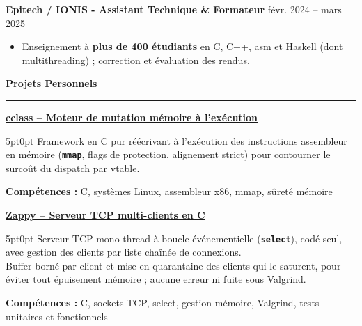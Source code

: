 \documentclass[9pt]{extarticle}
\begin{document}
\par\vspace{5pt}

{\bfseries Epitech / IONIS - Assistant Technique \& Formateur} \hfill févr. 2024 -- mars 2025
\begin{itemize}[noitemsep, topsep=0pt]
	\item Enseignement à {\bfseries plus de 400 étudiants} en C, C++, asm et Haskell (dont multithreading) ; correction et évaluation des rendus.
\end{itemize}

\par\vspace{5pt}

{\large\bfseries Projets Personnels}
\par\vspace{-8pt}
\rule{\linewidth}{0.4pt}
\par\vspace{5pt}

\underline{\bfseries \href{https://github.com/paulogarithm/cclass}{cclass} -- Moteur de mutation mémoire à l'exécution}
\par
\begin{adjustwidth}{5pt}{0pt}
    Framework en C pur réécrivant à l'exécution des instructions assembleur en mémoire ({\bfseries \texttt{mmap}}, flags de protection, alignement strict) pour contourner le surcoût du dispatch par vtable.
\end{adjustwidth}
\par
{\bfseries Compétences :} C, systèmes Linux, assembleur x86, mmap, sûreté mémoire

\par\vspace{8pt}

\underline{\bfseries Zappy -- Serveur TCP multi-clients en C}
\par
\begin{adjustwidth}{5pt}{0pt}
    Serveur TCP mono-thread à boucle événementielle ({\bfseries \texttt{select}}), codé seul, avec gestion des clients par liste chaînée de connexions. \\
    Buffer borné par client et mise en quarantaine des clients qui le saturent, pour éviter tout épuisement mémoire ; aucune erreur ni fuite sous Valgrind.
\end{adjustwidth}
\par
{\bfseries Compétences :} C, sockets TCP, select, gestion mémoire, Valgrind, tests unitaires et fonctionnels
\end{document}

